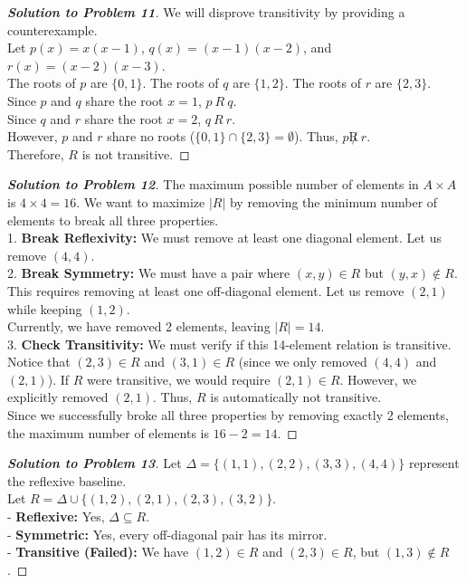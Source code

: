 \documentclass[11pt, a4paper]{article}
\theoremstyle{definition}
\theoremstyle{remark}
\begin{document}
\begin{proof}[\textbf{Solution to Problem 11}]
We will disprove transitivity by providing a counterexample. \\
Let $p(x) = x(x-1)$, $q(x) = (x-1)(x-2)$, and $r(x) = (x-2)(x-3)$. \\
The roots of $p$ are $\{0, 1\}$. The roots of $q$ are $\{1, 2\}$. The roots of $r$ are $\{2, 3\}$. \\
Since $p$ and $q$ share the root $x = 1$, $p \ R \ q$. \\
Since $q$ and $r$ share the root $x = 2$, $q \ R \ r$. \\
However, $p$ and $r$ share no roots ($\{0, 1\} \cap \{2, 3\} = \emptyset$). Thus, $p \not R \ r$. \\
Therefore, $R$ is not transitive.
\end{proof}

\begin{proof}[\textbf{Solution to Problem 12}]
The maximum possible number of elements in $A \times A$ is $4 \times 4 = 16$. We want to maximize $|R|$ by removing the minimum number of elements to break all three properties. \\
1. \textbf{Break Reflexivity:} We must remove at least one diagonal element. Let us remove $(4, 4)$. \\
2. \textbf{Break Symmetry:} We must have a pair where $(x, y) \in R$ but $(y, x) \notin R$. This requires removing at least one off-diagonal element. Let us remove $(2, 1)$ while keeping $(1, 2)$. \\
Currently, we have removed 2 elements, leaving $|R| = 14$. \\
3. \textbf{Check Transitivity:} We must verify if this 14-element relation is transitive. Notice that $(2, 3) \in R$ and $(3, 1) \in R$ (since we only removed $(4,4)$ and $(2,1)$). If $R$ were transitive, we would require $(2, 1) \in R$. However, we explicitly removed $(2, 1)$. Thus, $R$ is automatically not transitive. \\
Since we successfully broke all three properties by removing exactly 2 elements, the maximum number of elements is $16 - 2 = 14$.
\end{proof}

\begin{proof}[\textbf{Solution to Problem 13}]
Let $\Delta = \{(1,1), (2,2), (3,3), (4,4)\}$ represent the reflexive baseline. \\
Let $R = \Delta \cup \{(1, 2), (2, 1), (2, 3), (3, 2)\}$. \\
- \textbf{Reflexive:} Yes, $\Delta \subseteq R$. \\
- \textbf{Symmetric:} Yes, every off-diagonal pair has its mirror. \\
- \textbf{Transitive (Failed):} We have $(1, 2) \in R$ and $(2, 3) \in R$, but $(1, 3) \notin R$.
\end{proof}
\end{document}
